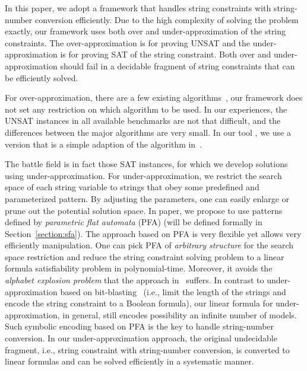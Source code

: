 \documentclass[sigplan,review,anonymous]{acmart}\settopmatter{printfolios=true,printccs=false,printacmref=false}
\begin{document}
In this paper, we adopt a framework that handles string constraints with string-number conversion efficiently. Due to the high complexity of solving the problem exactly, our framework uses both over and under-approximation of the string constraints. The over-approximation is for proving UNSAT and the under-approximation is for proving SAT of the string constraint. Both over and under-approximation should fail in a decidable fragment of string constraints that can be efficiently solved. 

For over-approximation, there are a few existing algorithms~\cite{parosh2019chain,z3,chen2019decision}, our framework does not set any restriction on which algorithm to be used. In our experiences, the UNSAT instances in all available benchmarks are not that difficult, and the differences between the major algorithms are very small. In our tool \tool, we use a version that is a simple adaption of the algorithm in~\cite{parosh2019chain}.

The battle field is in fact those SAT instances, for which we develop solutions using under-approximation. For under-approximation, we restrict the search space of each string variable to strings that obey some predefined and parameterized pattern. By adjusting the parameters, one can easily enlarge or prune out the potential solution space. In paper, we propose to use patterns defined by \emph{parametric flat automata} (PFA) (will be defined formally in Section~\ref{section:sfa}). The approach based on PFA is very flexible yet allows very efficiently manipulation. One can pick PFA of \emph{arbitrary structure} for the search space restriction and reduce the string constraint solving problem to a linear formula satisfiability problem in polynomial-time. Moreover, it avoids the \textit{alphabet explosion problem} that the approach in~\cite{abdulla2017flatten} suffers. In contrast to under-approximation based on bit-blasting~\cite{kiezun2009hampi} (i.e., limit the length of the strings and encode the string constraint to a Boolean formula), our linear formula for under-approximation, in general,  still encodes possibility an infinite number of models. Such symbolic encoding based on PFA is the key to handle string-number conversion. In our under-approximation approach, the original undecidable fragment, i.e., string constraint with string-number conversion, is converted to linear formulas and can be solved efficiently in a systematic manner.
\end{document}
